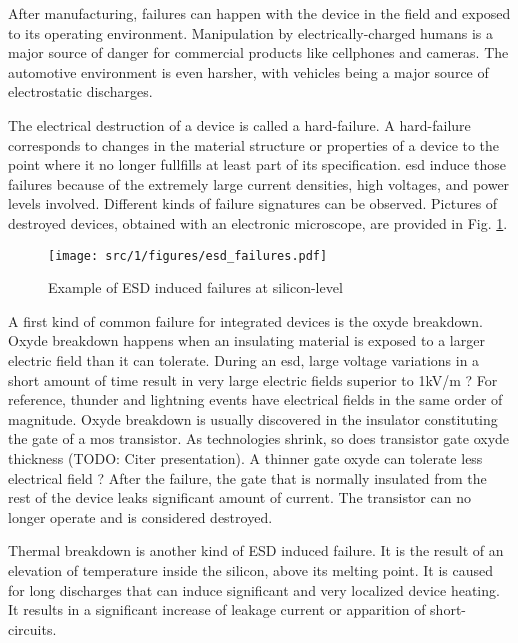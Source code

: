 After manufacturing, failures can happen with the device in the field and exposed to its operating environment.
Manipulation by electrically-charged humans is a major source of danger for commercial products like cellphones and cameras.
The automotive environment is even harsher, with vehicles being a major source of electrostatic discharges.

The electrical destruction of a device is called a hard-failure.
A hard-failure corresponds to changes in the material structure or properties of a device to the point where it no longer fullfills at least part of its specification.
\gls{esd} induce those failures because of the extremely large current densities, high voltages, and power levels involved.
Different kinds of failure signatures can be observed.
Pictures of destroyed devices, obtained with an electronic microscope, are provided in Fig. \ref{fig:silicon-level-failures}.

\begin{figure}[!h]
  \centering
  \texttt{[image: src/1/figures/esd\_failures.pdf]}
  \caption{Example of ESD induced failures at silicon-level}
  \label{fig:silicon-level-failures}
\end{figure}


A first kind of common failure for integrated devices is the oxyde breakdown.
Oxyde breakdown happens when an insulating material is exposed to a larger electric field than it can tolerate.
During an \gls{esd}, large voltage variations in a short amount of time result in very large electric fields superior to 1kV/m ?
For reference, thunder and lightning events have electrical fields in the same order of magnitude.
Oxyde breakdown is usually discovered in the insulator constituting the gate of a \gls{mos} transistor.
As technologies shrink, so does transistor gate oxyde thickness (TODO: Citer presentation).
A thinner gate oxyde can tolerate less electrical field ?
After the failure, the gate that is normally insulated from the rest of the device leaks significant amount of current.
The transistor can no longer operate and is considered destroyed.

Thermal breakdown is another kind of ESD induced failure.
It is the result of an elevation of temperature inside the silicon, above its melting point.
It is caused for long discharges that can induce significant and very localized device heating.
It results in a significant increase of leakage current or apparition of short-circuits.

